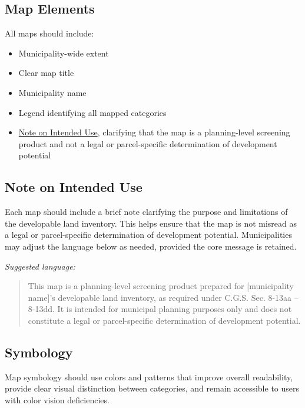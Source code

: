 \documentclass[
  letterpaper,
  DIV=11,
  numbers=noendperiod]{scrreprt}
\providecommand{\tightlist}{%
  \setlength{\itemsep}{0pt}\setlength{\parskip}{0pt}}
\begin{document}
\subsection{Map Elements}\label{map-elements}

All maps should include:

\begin{itemize}
\tightlist
\item
  Municipality-wide extent
\item
  Clear map title
\item
  Municipality name
\item
  Legend identifying all mapped categories
\item
  \hyperref[note-on-intended-use]{Note on Intended Use}, clarifying that
  the map is a planning-level screening product and not a legal or
  parcel-specific determination of development potential
\end{itemize}

\subsection{Note on Intended Use}\label{note-on-intended-use}

Each map should include a brief note clarifying the purpose and
limitations of the developable land inventory. This helps ensure that
the map is not misread as a legal or parcel-specific determination of
development potential. Municipalities may adjust the language below as
needed, provided the core message is retained.

\emph{Suggested language:}

\begin{quote}
This map is a planning-level screening product prepared for
{[}municipality name{]}'s developable land inventory, as required under
C.G.S. Sec. 8-13aa -- 8-13dd. It is intended for municipal planning
purposes only and does not constitute a legal or parcel-specific
determination of development potential.
\end{quote}

\subsection{Symbology}\label{symbology}

\begin{tcolorbox}[enhanced jigsaw, arc=.35mm, bottomrule=.15mm, breakable, colback=white, colframe=quarto-callout-caution-color-frame, left=2mm, leftrule=.75mm, opacityback=0, rightrule=.15mm, toprule=.15mm]

Map symbology should use colors and patterns that improve overall
readability, provide clear visual distinction between categories, and
remain accessible to users with color vision deficiencies.

\end{tcolorbox}
\end{document}
